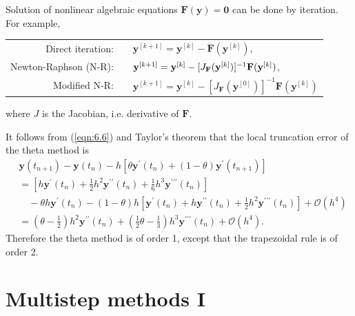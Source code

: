 \documentclass[a4paper]{article}
\begin{document}
Solution of nonlinear algebraic equations $\mathbf{F}(\mathbf{y})= \mathbf{0}$ can be done by iteration. For example,
\begin{center}
    \begin{tabular}{rl}
        Direct iteration:& $\quad \mathbf{y}^{[k+1]}=\mathbf{y}^{[k]}-\mathbf{F}(\mathbf{y}^{[k]})$,\\[0.5em]
Newton-Raphson (N-R):& $\quad \mathbf{y}^{[k+1]}=\mathbf{y}^{[k]}-[J_{\bf F}(\mathbf{y}^{[k]})]^{-1} \mathbf{F}(\mathbf{y}^{[k]})$,\\[0.5em]
Modified N-R:& $\quad \mathbf{y}^{[k+1]}=\mathbf{y}^{[k]}-[J_{\mathbf{F}}(\mathbf{y}^{[0]})]^{-1} \mathbf{F}(\mathbf{y}^{[k]})$
    \end{tabular}
\end{center}
where $J$ is the Jacobian, i.e. derivative of $\mathbf{F}$.

\begin{remark}
    It follows from (\ref{eqn:6.6}) and Taylor's theorem that the local truncation error of the theta method is
\[
\begin{aligned}
& \mathbf{y}\left(t_{n+1}\right)-\mathbf{y}\left(t_n\right)-h\left[\theta \mathbf{y}^{\prime}\left(t_n\right)+(1-\theta) \mathbf{y}^{\prime}\left(t_{n+1}\right)\right] \\
&= {\left[h \mathbf{y}^{\prime}\left(t_n\right)+\frac{1}{2} h^2 \mathbf{y}^{\prime \prime}\left(t_n\right)+\frac{1}{6} h^3 \mathbf{y}^{\prime \prime \prime}\left(t_n\right)\right] } \\
& \quad-\theta h \mathbf{y}^{\prime}\left(t_n\right)-(1-\theta) h\left[\mathbf{y}^{\prime}\left(t_n\right)+h \mathbf{y}^{\prime \prime}\left(t_n\right)+\frac{1}{2} h^2 \mathbf{y}^{\prime \prime \prime}\left(t_n\right)\right]+\mathcal{O}\left(h^4\right) \\
&=\left(\theta-\frac{1}{2}\right) h^2 \mathbf{y}^{\prime \prime}\left(t_n\right)+\left(\frac{1}{2} \theta-\frac{1}{3}\right) h^3 \mathbf{y}^{\prime \prime \prime}\left(t_n\right)+\mathcal{O}\left(h^4\right) .
\end{aligned}
\]
Therefore the theta method is of order 1, except that the trapezoidal rule is of order 2.
\end{remark}

\section{Multistep methods I}
\end{document}
